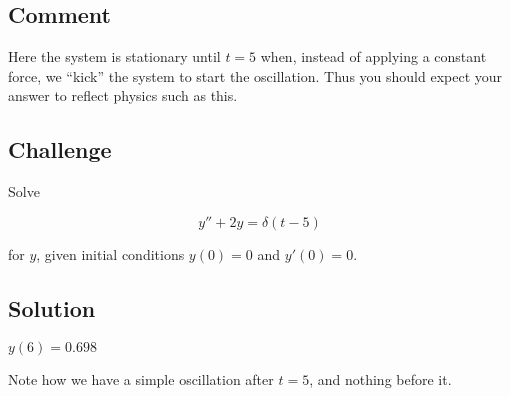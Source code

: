 \subsection*{Comment}
Here the system is stationary until $t=5$ when, instead of applying a constant force, we ``kick'' the system to start the oscillation. Thus you should expect your answer to reflect physics such as this.

\subsection*{Challenge}
Solve

\begin{equation}
    y''+2y=\delta(t-5)
\end{equation}

for $y$, given initial conditions $y(0)=0$ and $y'(0)=0$. 

\subsection*{Solution}

$y(6)=0.698$

Note how we have a simple oscillation after $t=5$, and nothing before it.
\fi

